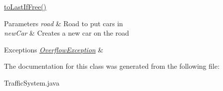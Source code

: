 \hyperlink{class_traffic_system_af3d20b7295d2989db50e6febf36033ae}{to\+Last\+If\+Free()} 


\begin{DoxyParams}{Parameters}
{\em road} & Road to put cars in \\
\hline
{\em new\+Car} & Creates a new car on the road \\
\hline
\end{DoxyParams}

\begin{DoxyExceptions}{Exceptions}
{\em \hyperlink{class_overflow_exception}{Overflow\+Exception}} & \\
\hline
\end{DoxyExceptions}


The documentation for this class was generated from the following file\+:\begin{DoxyCompactItemize}
\item 
Traffic\+System.\+java\end{DoxyCompactItemize}
